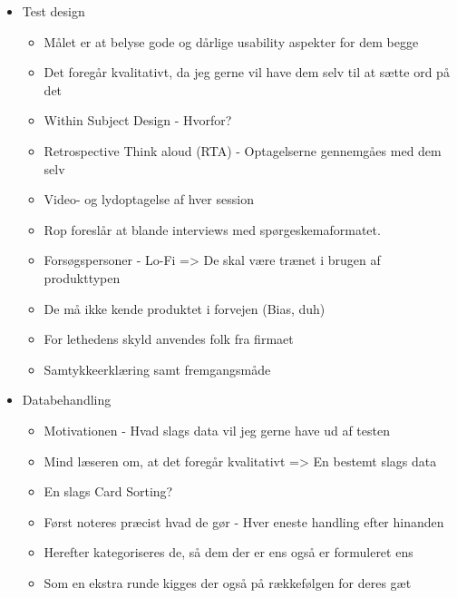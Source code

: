 \begin{itemize}
	
	\item Test design
	\begin{itemize}
		\item Målet er at belyse gode og dårlige usability aspekter for dem begge
		\item Det foregår kvalitativt, da jeg gerne vil have dem selv til at sætte ord på det
		\item Within Subject Design - Hvorfor?
		\item Retrospective Think aloud (RTA) - Optagelserne gennemgåes med dem selv
		\item Video- og lydoptagelse af hver session
		\item Rop foreslår at blande interviews med spørgeskemaformatet.
		\item Forsøgspersoner - Lo-Fi => De skal være trænet i brugen af produkttypen
		\item De må ikke kende produktet i forvejen (Bias, duh)
		\item For lethedens skyld anvendes folk fra firmaet
		\item Samtykkeerklæring samt fremgangsmåde
	\end{itemize}


	\item Databehandling
	\begin{itemize}
		\item Motivationen - Hvad slags data vil jeg gerne have ud af testen
		\item Mind læseren om, at det foregår kvalitativt => En bestemt slags data
		\item En slags Card Sorting?
		\item Først noteres præcist hvad de gør - Hver eneste handling efter hinanden
		\item Herefter kategoriseres de, så dem der er ens også er formuleret ens
		\item Som en ekstra runde kigges der også på rækkefølgen for deres gæt
	\end{itemize}


\end{itemize}
